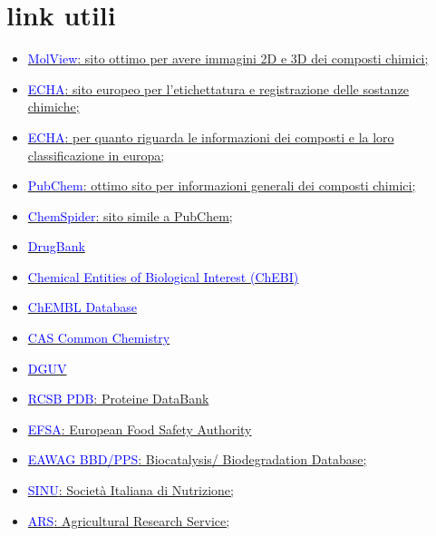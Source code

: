 \section*{link utili}
\begin{footnotesize}
\begin{multicols}{2}
\begin{itemize}
    \item \href{https://molview.org/}{\textcolor{blue}{MolView}: sito ottimo per avere immagini 2D e 3D dei composti chimici;}
    \item \href{https://echa.europa.eu/it/regulations/clp/clp-pictograms}{\textcolor{blue}{ECHA}: sito europeo per l'etichettatura e registrazione delle sostanze chimiche;}
    \item \href{https://echa.europa.eu/it/information-on-chemicals/cl-inventory-database}{\textcolor{blue}{ECHA}: per quanto riguarda le informazioni dei composti e la loro classificazione in europa;}
    \item \href{https://pubchem.ncbi.nlm.nih.gov/}{\textcolor{blue}{PubChem}: ottimo sito per informazioni generali dei composti chimici;}
    \item \href{http://www.chemspider.com/}{\textcolor{blue}{ChemSpider}: sito simile a PubChem;}
    \item \href{https://go.drugbank.com/}{\textcolor{blue}{DrugBank}}
    \item \href{https://www.ebi.ac.uk/chebi/init.do}{\textcolor{blue}{Chemical Entities of Biological Interest (ChEBI)}}
    \item \href{https://www.ebi.ac.uk/chembl/}{\textcolor{blue}{ChEMBL Database}}
    \item \href{https://commonchemistry.cas.org/}{\textcolor{blue}{CAS Common Chemistry}}
    \item \href{https://dguv.de/corona/index.jsp}{\textcolor{blue}{DGUV}}
    \item \href{https://www.rcsb.org/}{\textcolor{blue}{RCSB PDB}: Proteine DataBank}
    \item \href{https://www.efsa.europa.eu/it}{\textcolor{blue}{EFSA}: European Food Safety Authority}
    \item \href{http://eawag-bbd.ethz.ch/}{\textcolor{blue}{EAWAG BBD/PPS}: Biocatalysis/ Biodegradation Database;}
    \item \href{https://sinu.it/}{\textcolor{blue}{SINU}: Società Italiana di Nutrizione;}
    \item \href{https://www.ars.usda.gov/}{\textcolor{blue}{ARS}: Agricultural Research Service;}

\end{itemize}
\end{multicols}
\end{footnotesize}
